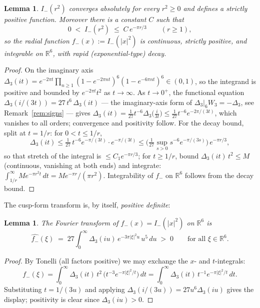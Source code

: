 \documentclass[11pt,reqno]{amsart}
\theoremstyle{plain}
\newtheorem{lemma}[theorem]{Lemma}
\theoremstyle{definition}
\theoremstyle{remark}
\newcommand{\R}{\mathbb{R}}
\newcommand{\Dthree}{\Delta_{3}}
\newcommand{\Imm}{I_{-}}
\newcommand{\fhat}[1]{\widehat{#1}}
\begin{document}
\begin{lemma}\label{lem:Iminus}
$\Imm(r^2)$ converges absolutely for every $r^2\ge0$ and defines a
strictly positive function.  Moreover there is a constant $C$ such
that
\[
0\;<\;\Imm(r^2)\;\le\;C\,e^{-\pi r/3}\qquad(r\ge1),
\]
so the radial function $f_-(x):=\Imm(|x|^2)$ is continuous, strictly
positive, and integrable on $\R^6$, with rapid (exponential-type)
decay.
\end{lemma}

\begin{proof}
On the imaginary axis $\Dthree(it)=e^{-2\pi
t}\prod_{n\ge1}(1-e^{-2\pi nt})^6(1-e^{-6\pi nt})^6\in(0,1)$, so the
integrand is positive and bounded by $e^{-2\pi t}t^2$ as
$t\to\infty$.  As $t\to0^+$, the functional equation
$\Dthree(i/(3t))=27\,t^6\,\Dthree(it)$ --- the imaginary-axis form of
$\Dthree|_6W_3=-\Dthree$, see Remark~\ref{rem:signs} --- gives
$\Dthree(it)=\tfrac1{27}t^{-6}\Dthree\big(\tfrac{i}{3t}\big)
\le \tfrac1{27}t^{-6}e^{-2\pi/(3t)}$,
which vanishes to all orders; convergence and positivity follow.  For
the decay bound, split at $t=1/r$: for $0<t\le1/r$,
\[
\Dthree(it)\le\tfrac1{27}\,t^{-6}e^{-\pi/(3t)}\cdot e^{-\pi/(3t)}
\le \Big(\tfrac1{27}\sup_{s>0}s^{-6}e^{-\pi/(3s)}\Big)\,e^{-\pi r/3},
\]
so that stretch of the integral is $\le C_1e^{-\pi r/3}$; for
$t\ge1/r$, bound $\Dthree(it)\,t^2\le M$ (continuous, vanishing at
both ends) and integrate: $\int_{1/r}^\infty Me^{-\pi
r^2t}\,dt=Me^{-\pi r}/(\pi r^2)$.  Integrability of $f_-$ on $\R^6$
follows from the decay bound.
\end{proof}

The cusp-form transform is, by itself, \emph{positive definite}:

\begin{lemma}\label{lem:Fpositive}
The Fourier transform of $f_-(x)=\Imm(|x|^2)$ on $\R^6$ is
\[
\fhat{f_-}(\xi)\;=\;27\int_0^\infty \Dthree(iu)\,
e^{-3\pi|\xi|^2u}\,u^5\,du\;>\;0
\qquad\text{for all }\xi\in\R^6 .
\]
\end{lemma}

\begin{proof}
By Tonelli (all factors positive) we may exchange the $x$- and
$t$-integrals:
\[
\fhat{f_-}(\xi)=\int_0^\infty\Dthree(it)\,t^2\,
\big(t^{-3}e^{-\pi|\xi|^2/t}\big)\,dt
=\int_0^\infty\Dthree(it)\,t^{-1}e^{-\pi|\xi|^2/t}\,dt .
\]
Substituting $t=1/(3u)$ and applying
$\Dthree(i/(3u))=27u^6\Dthree(iu)$ gives the display; positivity is
clear since $\Dthree(iu)>0$.
\end{proof}
\end{document}

